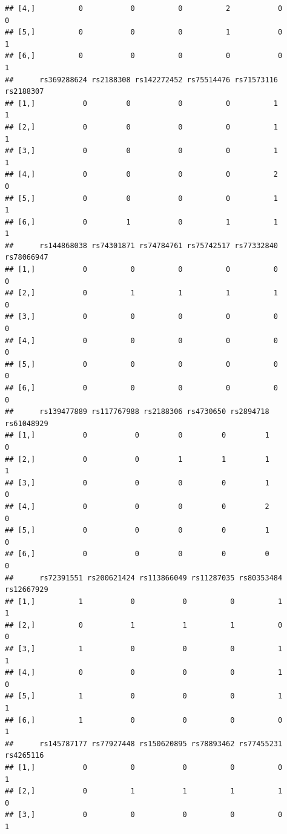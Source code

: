 \documentclass[
]{article}
\begin{document}
\begin{verbatim}
## [4,]          0           0          0          2           0         0
## [5,]          0           0          0          1           0         1
## [6,]          0           0          0          0           0         1
##      rs369288624 rs2188308 rs142272452 rs75514476 rs71573116 rs2188307
## [1,]           0         0           0          0          1         1
## [2,]           0         0           0          0          1         1
## [3,]           0         0           0          0          1         1
## [4,]           0         0           0          0          2         0
## [5,]           0         0           0          0          1         1
## [6,]           0         1           0          1          1         1
##      rs144868038 rs74301871 rs74784761 rs75742517 rs77332840 rs78066947
## [1,]           0          0          0          0          0          0
## [2,]           0          1          1          1          1          0
## [3,]           0          0          0          0          0          0
## [4,]           0          0          0          0          0          0
## [5,]           0          0          0          0          0          0
## [6,]           0          0          0          0          0          0
##      rs139477889 rs117767988 rs2188306 rs4730650 rs2894718 rs61048929
## [1,]           0           0         0         0         1          0
## [2,]           0           0         1         1         1          1
## [3,]           0           0         0         0         1          0
## [4,]           0           0         0         0         2          0
## [5,]           0           0         0         0         1          0
## [6,]           0           0         0         0         0          0
##      rs72391551 rs200621424 rs113866049 rs11287035 rs80353484 rs12667929
## [1,]          1           0           0          0          1          1
## [2,]          0           1           1          1          0          0
## [3,]          1           0           0          0          1          1
## [4,]          0           0           0          0          1          0
## [5,]          1           0           0          0          1          1
## [6,]          1           0           0          0          0          1
##      rs145787177 rs77927448 rs150620895 rs78893462 rs77455231 rs4265116
## [1,]           0          0           0          0          0         1
## [2,]           0          1           1          1          1         0
## [3,]           0          0           0          0          0         1

\end{verbatim}
\end{document}
